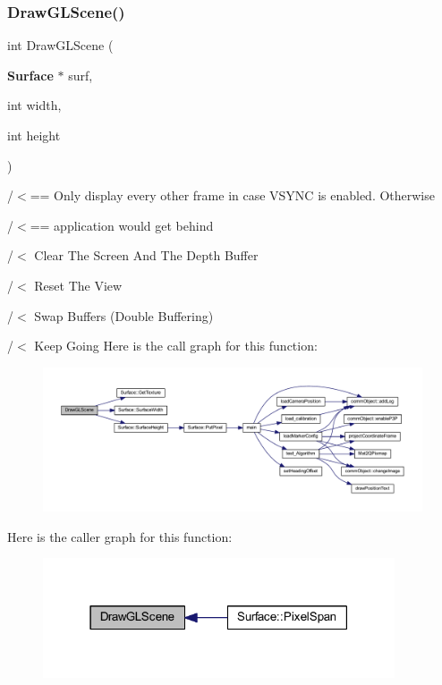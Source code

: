 \subsubsection{Draw\+G\+L\+Scene()}
{\footnotesize\ttfamily int Draw\+G\+L\+Scene (\begin{DoxyParamCaption}\item[{\textbf{ Surface} $\ast$}]{surf,  }\item[{int}]{width,  }\item[{int}]{height }\end{DoxyParamCaption})}

/$<$== Only display every other frame in case V\+S\+Y\+NC is enabled. Otherwise

/$<$== application would get behind

/$<$ Clear The Screen And The Depth Buffer

/$<$ Reset The View

/$<$ Swap Buffers (Double Buffering)

/$<$ Keep Going Here is the call graph for this function\+:\nopagebreak
\begin{figure}[H]
\begin{center}
\leavevmode
\includegraphics[width=350pt]{supportcode_8cpp_ac43c2dc16b0859b03a4f7d04a7e97d3c_cgraph}
\end{center}
\end{figure}
Here is the caller graph for this function\+:\nopagebreak
\begin{figure}[H]
\begin{center}
\leavevmode
\includegraphics[width=295pt]{supportcode_8cpp_ac43c2dc16b0859b03a4f7d04a7e97d3c_icgraph}
\end{center}
\end{figure}
\mbox{\label{supportcode_8cpp_a79e747d7a0c4b5bad264e5a27c00baa5}} 
